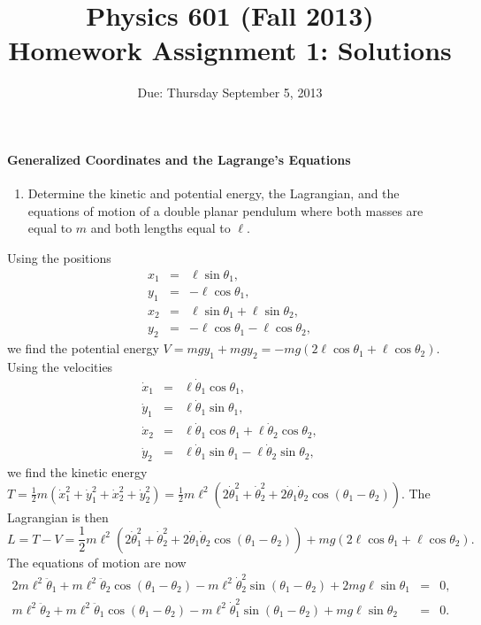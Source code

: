 \documentclass[letterpaper,11pt]{article}
\title{Physics 601 (Fall 2013) \\ Homework Assignment 1: Solutions}
\date{Due: Thursday September 5, 2013}
\begin{document}
\maketitle

\paragraph*{Generalized Coordinates and the Lagrange's Equations}
\begin{enumerate}
 \item Determine the kinetic and potential energy, the Lagrangian, and the equations of motion of a double planar pendulum where both masses are equal to $m$ and both lengths equal to $\ell$.
\end{enumerate}
Using the positions
\begin{eqnarray*}
 x_1 & = & \ell\sin\theta_1, \\
 y_1 & = & - \ell\cos\theta_1, \\
 x_2 & = & \ell\sin\theta_1 + \ell\sin\theta_2, \\
 y_2 & = & - \ell\cos\theta_1 - \ell\cos\theta_2,
\end{eqnarray*}
we find the potential energy $V = mgy_1 + mgy_2 = -mg(2\ell\cos\theta_1 + \ell\cos\theta_2)$.  Using the velocities
\begin{eqnarray*}
 \dot{x}_1 & = & \ell\dot{\theta}_1\cos\theta_1, \\
 \dot{y}_1 & = & \ell\dot{\theta}_1\sin\theta_1, \\
 \dot{x}_2 & = & \ell\dot{\theta}_1\cos\theta_1 + \ell\dot{\theta}_2\cos\theta_2, \\
 \dot{y}_2 & = & \ell\dot{\theta}_1\sin\theta_1 - \ell\dot{\theta}_2\sin\theta_2,
\end{eqnarray*}
we find the kinetic energy $T = \frac{1}{2}m\left(\dot{x}_1^2 + \dot{y}_1^2 + \dot{x}_2^2 + \dot{y}_2^2\right) = \frac{1}{2}m\ell^2\left(2\dot{\theta}_1^2 + \dot{\theta}_2^2 + 2 \dot{\theta}_1 \dot{\theta}_2 \cos(\theta_1 - \theta_2)\right)$.  The Lagrangian is then
\begin{equation*}
 L = T - V = \frac{1}{2}m\ell^2\left(2\dot{\theta}_1^2 + \dot{\theta}_2^2 + 2 \dot{\theta}_1 \dot{\theta}_2 \cos(\theta_1 - \theta_2)\right) + mg(2\ell\cos\theta_1 + \ell\cos\theta_2).
\end{equation*}
The equations of motion are now
\begin{eqnarray*}
 2m\ell^2\ddot{\theta}_1 + m\ell^2\ddot{\theta}_2\cos(\theta_1 - \theta_2) - m\ell^2\dot{\theta}_2^2\sin(\theta_1 - \theta_2) + 2mg\ell\sin\theta_1 & = & 0, \\
 m\ell^2\ddot{\theta}_2 + m\ell^2\ddot{\theta}_1\cos(\theta_1 - \theta_2) - m\ell^2\dot{\theta}_1^2\sin(\theta_1 - \theta_2) + mg\ell\sin\theta_2 & = & 0.
\end{eqnarray*}
\end{document}
